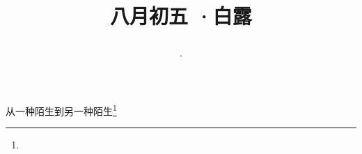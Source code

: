 \title{\date[d=7,m=9,y=2024][year:cn-y,年,month:cn,day:cn,日,·,weekday]·八月初五 ·白露}
从一种陌生到另一种陌生\footnote{ }

